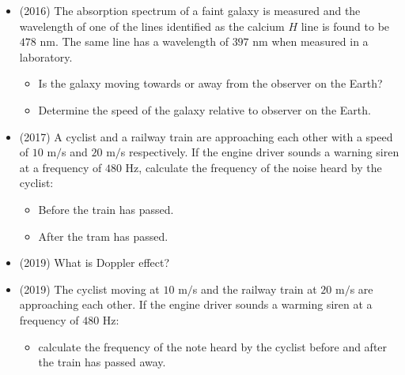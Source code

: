 \documentclass{article}
\begin{document}
\begin{itemize}
\item (2016)  The absorption spectrum of a faint galaxy is measured and the wavelength of one of the lines identified as the calcium $ H$ line is found to be $ 478$ nm.  The same line has a wavelength of $ 397$ nm when measured in a laboratory. 
 \begin{itemize}
\item Is the galaxy moving towards or away from the observer on the Earth?
\item Determine the speed of the galaxy relative to observer on the Earth.
\end{itemize}
\item (2017)  A cyclist and a railway train are approaching each other with a speed of $ 10$ m$/$s and $ 20$ m$/$s respectively. If the engine driver sounds a warning siren at a frequency of  $ 480$ Hz, calculate the frequency of the noise heard by the cyclist:
 \begin{itemize}
\item Before the train has passed.
\item After the tram has passed. 
\end{itemize}
\item (2019)  What is Doppler effect? 
\item (2019)  The cyclist moving at $ 10$ m$/$s and the railway train at $ 20$ m$/$s are approaching each other. If the engine driver sounds a warming siren at a frequency of $ 480$ Hz:
 \begin{itemize}
\item calculate the frequency of the note heard by the cyclist before and after the train has passed away. 
\end{itemize}
\end{itemize}
\end{document}
